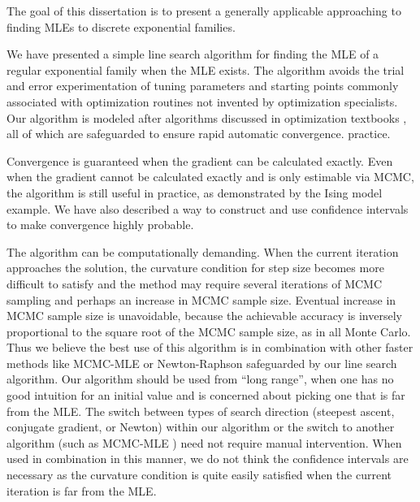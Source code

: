 The goal of this dissertation is to present a generally applicable approaching
to finding MLEs to discrete exponential families.

We have presented a simple line search algorithm for finding the MLE of a regular 
exponential family when the MLE 
exists.  The algorithm avoids the trial and error experimentation of tuning parameters 
and starting points commonly associated with optimization routines
not invented by optimization specialists.  Our algorithm is modeled after algorithms 
discussed in optimization textbooks \citep{Fletcher,NW,Sun:2006},
all of which are safeguarded to ensure rapid automatic convergence.
practice.

Convergence is guaranteed when the gradient can be calculated exactly.  Even when the 
gradient cannot be calculated 
exactly and is only estimable via MCMC, the algorithm is still useful in practice, as 
demonstrated by the Ising model 
example.  We have also described a way to construct and use confidence intervals to 
make convergence highly probable.

The algorithm can be computationally demanding.  When the current iteration approaches 
the solution, the 
curvature condition for step size becomes more difficult to satisfy and the method may 
require several iterations of 
MCMC sampling and perhaps an increase in MCMC sample size.  Eventual increase in MCMC 
sample size is unavoidable,
because the achievable accuracy is inversely proportional to the square root of the 
MCMC sample size, as in all Monte Carlo.
Thus we believe the best use of this algorithm is in combination with other faster 
methods like MCMC-MLE \citep{Geyer:1992}
or Newton-Raphson safeguarded by our line search algorithm.  Our 
algorithm should be used from ``long range'', when one has no good intuition for an 
initial value and is concerned about 
picking one that is far from the MLE.  The switch between types of search direction 
(steepest ascent, conjugate gradient,
or Newton) within our algorithm or the switch to another algorithm (such as MCMC-MLE 
\citep{Geyer:1992})
need not require manual intervention.  When used in combination in this
manner, we do not think the confidence intervals are necessary as the curvature 
condition is quite easily satisfied 
when the current iteration is far from the MLE.

